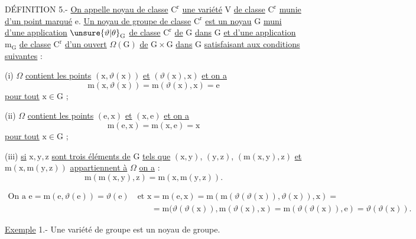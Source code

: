 DÉFINITION 5.- \uline{On appelle noyau de classe} $\mathrm C^{\mathrm r}$ \uline{une variété} $\mathrm V$ \uline{de classe} $\mathrm C^{\mathrm r}$ \uline{munie d'un point marqué} $\mathrm e$. \uline{Un noyau de groupe de classe} $\mathrm C^{\mathrm r}$ \uline{est un noyau} $\mathrm G$ \uline{muni d'une application} $\unsure{\vartheta|\theta}_{\mathrm G}$ \uline{de classe} $\mathrm C^{\mathrm r}$ \uline{de} $\mathrm G$ \uline{dans} $\mathrm G$ \uline{et d'une application} $\mathrm m_{\mathrm G}$ \uline{de classe} $\mathrm C^{\mathrm r}$ \uline{d'un ouvert} $\Omega(\mathrm G)$ \uline{de} $\mathrm G\times\mathrm G$ \uline{dans} $\mathrm G$ \uline{satisfaisant aux conditions suivantes} :

\begingroup
\makeatletter\tagsleft@true\makeatother
(i) $\Omega$ \uline{contient les points} $(\mathrm x,\vartheta(\mathrm x))$ \uline{et} $(\vartheta(\mathrm x),\mathrm x)$ \uline{et on a}
\[
\mathrm m(\mathrm x,\vartheta(\mathrm x))=\mathrm m(\vartheta(\mathrm x),\mathrm x)=\mathrm e \tag*{(36)}
\]
\uline{pour tout} $\mathrm x\in\mathrm G$ ;

(ii) $\Omega$ \uline{contient les points} $(\mathrm e,\mathrm x)$ \uline{et} $(\mathrm x,\mathrm e)$ \uline{et on a}
\[
\mathrm m(\mathrm e,\mathrm x)=\mathrm m(\mathrm x,\mathrm e)=\mathrm x \tag*{(37)}
\]
\uline{pour tout} $\mathrm x\in\mathrm G$ ;

(iii) \uline{si} $\mathrm x,\mathrm y,\mathrm z$ \uline{sont trois éléments de} $\mathrm G$ \uline{tels que} $(\mathrm x,\mathrm y)$, $(\mathrm y,\mathrm z)$, $(\mathrm m(\mathrm x,\mathrm y),\mathrm z)$ \uline{et} $\mathrm m(\mathrm x,\mathrm m(\mathrm y,\mathrm z))$ \uline{appartiennent à} $\Omega$\handwritten{$\unsure{\searrow|,}$} \uline{on a} :
\[
\mathrm m(\mathrm m(\mathrm x,\mathrm y),\mathrm z)=\mathrm m(\mathrm x,\mathrm m(\mathrm y,\mathrm z)). \tag*{(38)}
\]
\endgroup

\[
\begin{aligned}
\text{On a }\mathrm e=\mathrm m(\mathrm e,\vartheta(\mathrm e))=\vartheta(\mathrm e)
\quad\text{et }\mathrm x&=\mathrm m(\mathrm e,\mathrm x)=\mathrm m(\mathrm m(\vartheta(\vartheta(\mathrm x)),\vartheta(\mathrm x)),\mathrm x)=\\
&=\mathrm m(\vartheta(\vartheta(\mathrm x)),\mathrm m(\vartheta(\mathrm x),\mathrm x)=\mathrm m(\vartheta(\vartheta(\mathrm x)),\mathrm e)=\vartheta(\vartheta(\mathrm x)).
\end{aligned}
\]

\uline{Exemple} 1.- Une variété de groupe est un noyau de groupe.

